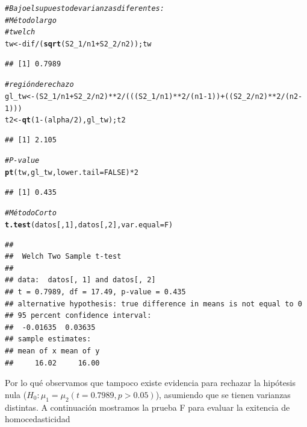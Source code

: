 \documentclass[a4paper]{scrartcl}\usepackage[]{graphicx}\usepackage[]{color}
\makeatletter
\newcommand{\hlnum}[1]{\textcolor[rgb]{0.686,0.059,0.569}{#1}}%
\newcommand{\hlcom}[1]{\textcolor[rgb]{0.678,0.584,0.686}{\textit{#1}}}%
\newcommand{\hlopt}[1]{\textcolor[rgb]{0,0,0}{#1}}%
\newcommand{\hlstd}[1]{\textcolor[rgb]{0.345,0.345,0.345}{#1}}%
\newcommand{\hlkwb}[1]{\textcolor[rgb]{0.69,0.353,0.396}{#1}}%
\newcommand{\hlkwc}[1]{\textcolor[rgb]{0.333,0.667,0.333}{#1}}%
\newcommand{\hlkwd}[1]{\textcolor[rgb]{0.737,0.353,0.396}{\textbf{#1}}}%
\newenvironment{kframe}{%
 \def\at@end@of@kframe{}%
 \ifinner\ifhmode%
  \def\at@end@of@kframe{\end{minipage}}%
  \begin{minipage}{\columnwidth}%
 \fi\fi%
 \def\FrameCommand##1{\hskip\@totalleftmargin \hskip-\fboxsep
 \colorbox{shadecolor}{##1}\hskip-\fboxsep
     \hskip-\linewidth \hskip-\@totalleftmargin \hskip\columnwidth}%
 \MakeFramed {\advance\hsize-\width
   \@totalleftmargin\z@ \linewidth\hsize
   \@setminipage}}%
 {\par\unskip\endMakeFramed%
 \at@end@of@kframe}
\newenvironment{knitrout}{}{} %
\makeatother
\begin{document}
\begin{knitrout}
\color{fgcolor}\begin{kframe}
\begin{alltt}
\hlcom{# Bajo el supuesto de varianzas diferentes:}
\hlcom{# Método largo}
\hlcom{# t welch}
\hlstd{tw} \hlkwb{<-} \hlstd{dif} \hlopt{/} \hlstd{(}\hlkwd{sqrt}\hlstd{(S2_1}\hlopt{/}\hlstd{n1} \hlopt{+} \hlstd{S2_2}\hlopt{/}\hlstd{n2)); tw}
\end{alltt}
\begin{verbatim}
## [1] 0.7989
\end{verbatim}
\begin{alltt}
\hlcom{#región de rechazo}
\hlstd{gl_tw} \hlkwb{<-} \hlstd{(S2_1}\hlopt{/}\hlstd{n1} \hlopt{+} \hlstd{S2_2}\hlopt{/}\hlstd{n2)}\hlopt{**}\hlnum{2} \hlopt{/} \hlstd{(((S2_1}\hlopt{/}\hlstd{n1)}\hlopt{**}\hlnum{2}\hlopt{/}\hlstd{(n1} \hlopt{-} \hlnum{1}\hlstd{))} \hlopt{+} \hlstd{((S2_2}\hlopt{/}\hlstd{n2)}\hlopt{**}\hlnum{2}\hlopt{/}\hlstd{(n2}\hlopt{-}\hlnum{1}\hlstd{)))}
\hlstd{t2} \hlkwb{<-} \hlkwd{qt}\hlstd{(}\hlnum{1}\hlopt{-}\hlstd{(alpha}\hlopt{/}\hlnum{2}\hlstd{), gl_tw); t2}
\end{alltt}
\begin{verbatim}
## [1] 2.105
\end{verbatim}
\begin{alltt}
\hlcom{# P-value}
\hlkwd{pt}\hlstd{(tw, gl_tw,} \hlkwc{lower.tail} \hlstd{=} \hlnum{FALSE}\hlstd{)} \hlopt{*} \hlnum{2}
\end{alltt}
\begin{verbatim}
## [1] 0.435
\end{verbatim}
\begin{alltt}
\hlcom{# Método Corto}
\hlkwd{t.test}\hlstd{(datos[,} \hlnum{1}\hlstd{], datos[,} \hlnum{2}\hlstd{],} \hlkwc{var.equal}\hlstd{=F)}
\end{alltt}
\begin{verbatim}
## 
## 	Welch Two Sample t-test
## 
## data:  datos[, 1] and datos[, 2]
## t = 0.7989, df = 17.49, p-value = 0.435
## alternative hypothesis: true difference in means is not equal to 0
## 95 percent confidence interval:
##  -0.01635  0.03635
## sample estimates:
## mean of x mean of y 
##     16.02     16.00
\end{verbatim}
\end{kframe}
\end{knitrout}

\noindent Por lo qué observamos que tampoco existe evidencia para rechazar la hipótesis nula ($H_0: \mu_1 = \mu_2 (t= 0.7989,p>0.05)$), asumiendo que se tienen varianzas distintas. A continuación mostramos la prueba F para evaluar la exitencia de homocedasticidad
\end{document}
